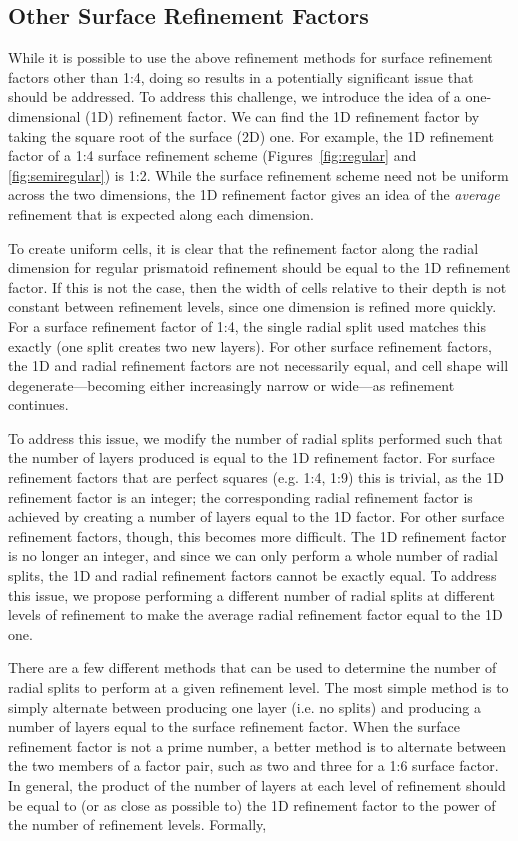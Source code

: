 \subsection{Other Surface Refinement Factors} \label{sec:grid:factors}
While it is possible to use the above refinement methods for surface refinement factors other than 1:4, doing so results in a potentially significant issue that should be addressed.
To address this challenge, we introduce the idea of a one-dimensional (1D) refinement factor.
We can find the 1D refinement factor by taking the square root of the surface (2D) one.
For example, the 1D refinement factor of a 1:4 surface refinement scheme (Figures~\ref{fig:regular} and \ref{fig:semiregular}) is 1:2.
While the surface refinement scheme need not be uniform across the two dimensions, the 1D refinement factor gives an idea of the \textit{average} refinement that is expected along each dimension.


To create uniform cells, it is clear that the refinement factor along the radial dimension for regular prismatoid refinement should be equal to the 1D refinement factor.
If this is not the case, then the width of cells relative to their depth is not constant between refinement levels, since one dimension is refined more quickly.
For a surface refinement factor of 1:4, the single radial split used matches this exactly (one split creates two new layers).
For other surface refinement factors, the 1D and radial refinement factors are not necessarily equal, and cell shape will degenerate---becoming either increasingly narrow or wide---as refinement continues.


To address this issue, we modify the number of radial splits performed such that the number of layers produced is equal to the 1D refinement factor.
For surface refinement factors that are perfect squares (e.g.
1:4, 1:9) this is trivial, as the 1D refinement factor is an integer; the corresponding radial refinement factor is achieved by creating a number of layers equal to the 1D factor.
For other surface refinement factors, though, this becomes more difficult.
The 1D refinement factor is no longer an integer, and since we can only perform a whole number of radial splits, the 1D and radial refinement factors cannot be exactly equal.
To address this issue, we propose performing a different number of radial splits at different levels of refinement to make the average radial refinement factor equal to the 1D one.


There are a few different methods that can be used to determine the number of radial splits to perform at a given refinement level.
The most simple method is to simply alternate between producing one layer (i.e.
no splits) and producing a number of layers equal to the surface refinement factor.
When the surface refinement factor is not a prime number, a better method is to alternate between the two members of a factor pair, such as two and three for a 1:6 surface factor.
In general, the product of the number of layers at each level of refinement should be equal to (or as close as possible to) the 1D refinement factor to the power of the number of refinement levels.
Formally,

